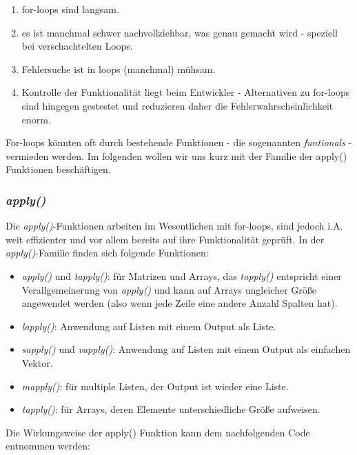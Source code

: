 \documentclass[]{article}
\providecommand{\tightlist}{%
  \setlength{\itemsep}{0pt}\setlength{\parskip}{0pt}}
\begin{document}
\begin{enumerate}
\def\labelenumi{\arabic{enumi}.}
\tightlist
\item
  for-loops sind langsam.
\item
  es ist manchmal schwer nachvollziehbar, was genau gemacht wird -
  speziell bei verschachtelten Loops.
\item
  Fehlersuche ist in loops (manchmal) mühsam.
\item
  Kontrolle der Funktionalität liegt beim Entwickler - Alternativen zu
  for-loops sind hingegen gestestet und reduzieren daher die
  Fehlerwahrscheinlichkeit enorm.
\end{enumerate}

For-loops könnten oft durch bestehende Funktionen - die sogenannten
\emph{funtionals} - vermieden werden. Im folgenden wollen wir uns kurz
mit der Familie der apply() Funktionen beschäftigen.

\subsubsection*{\texorpdfstring{\emph{apply()}}{apply()}}\label{apply}

Die \emph{apply()}-Funktionen arbeiten im Wesentlichen mit for-loops,
sind jedoch i.A. weit effizienter und vor allem bereits auf ihre
Funktionalität geprüft. In der \emph{apply()}-Familie finden sich
folgende Funktionen:

\begin{itemize}
\tightlist
\item
  \emph{apply()} und \emph{tapply()}: für Matrizen und Arrays, das
  \emph{tapply()} entspricht einer Verallgemeinerung von \emph{apply()}
  und kann auf Arrays ungleicher Größe angewendet werden (also wenn jede
  Zeile eine andere Anzahl Spalten hat).
\item
  \emph{lapply()}: Anwendung auf Listen mit einem Output als Liste.
\item
  \emph{sapply()} und \emph{vapply()}: Anwendung auf Listen mit einem
  Output als einfachen Vektor.
\item
  \emph{mapply()}: für multiple Listen, der Output ist wieder eine
  Liste.
\item
  \emph{tapply()}: für Arrays, deren Elemente unterschiedliche Größe
  aufweisen.
\end{itemize}

Die Wirkungsweise der apply() Funktion kann dem nachfolgenden Code
entnommen werden:
\end{document}
